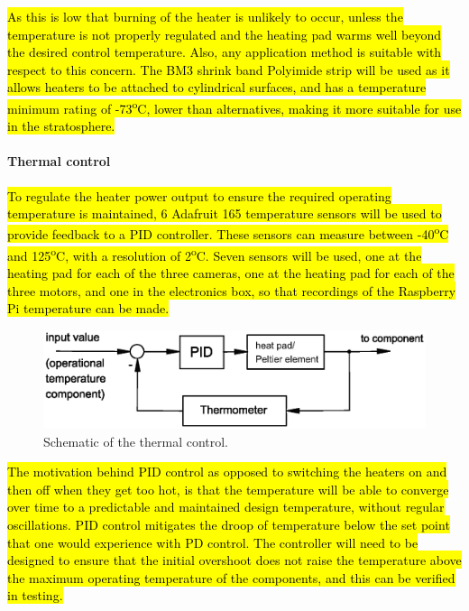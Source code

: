 \hl{As this is low that burning of the heater is unlikely to occur, unless the temperature is not properly regulated and the heating pad warms well beyond the desired control temperature. Also, any application method is suitable with respect to this concern. The BM3 shrink band Polyimide strip will be used as it allows heaters to be attached to cylindrical surfaces, and has a temperature minimum rating of -73\textsuperscript{o}C, lower than alternatives, making it more suitable for use in the stratosphere.}  \\

\paragraph{Thermal control}

\hl{To regulate the heater power output to ensure the required operating temperature is maintained, 6 Adafruit 165 temperature sensors will be used to provide feedback to a PID controller. These sensors can measure between -40\textsuperscript{o}C and 125\textsuperscript{o}C, with a resolution of 2\textsuperscript{o}C. Seven sensors will be used, one at the heating pad for each of the three cameras, one at the heating pad for each of the three motors, and one in the electronics box, so that recordings of the Raspberry Pi temperature can be made.} %

	\begin{figure}[h!]
    \centering
    \includegraphics[scale=0.6]{4-experiment-design/img/mechanical/Thermal_control.eps}
	\caption{Schematic of the thermal control.}
	\label{fig:Thermal_control}
	\end{figure}

\hl{The motivation behind PID control as opposed to switching the heaters on and then off when they get too hot, is that the temperature will be able to converge over time to a predictable and maintained design temperature, without regular oscillations. PID control mitigates the droop of temperature below the set point that one would experience with PD control. The controller will need to be designed to ensure that the initial overshoot does not raise the temperature above the maximum operating temperature of the components, and this can be verified in testing.}    

